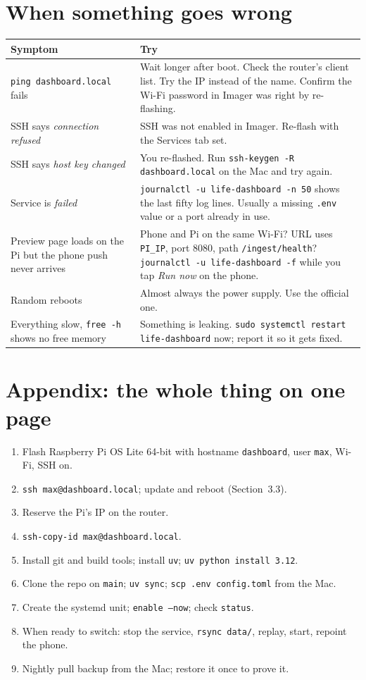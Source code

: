 \documentclass[11pt,letterpaper]{article}
\newcommand{\file}[1]{\texttt{#1}}
\newcommand{\cmd}[1]{\texttt{#1}}
\begin{document}
\section{When something goes wrong}

\begin{tabular}{@{}p{5.5cm}p{9.5cm}@{}}
\toprule
Symptom & Try \\
\midrule
\cmd{ping dashboard.local} fails & Wait longer after boot. Check the router's client list. Try the IP instead of the name. Confirm the Wi-Fi password in Imager was right by re-flashing. \\
SSH says \emph{connection refused} & SSH was not enabled in Imager. Re-flash with the Services tab set. \\
SSH says \emph{host key changed} & You re-flashed. Run \cmd{ssh-keygen -R dashboard.local} on the Mac and try again. \\
Service is \emph{failed} & \cmd{journalctl -u life-dashboard -n 50} shows the last fifty log lines. Usually a missing \file{.env} value or a port already in use. \\
Preview page loads on the Pi but the phone push never arrives & Phone and Pi on the same Wi-Fi? URL uses \cmd{PI\_IP}, port 8080, path \cmd{/ingest/health}? \cmd{journalctl -u life-dashboard -f} while you tap \emph{Run now} on the phone. \\
Random reboots & Almost always the power supply. Use the official one. \\
Everything slow, \cmd{free -h} shows no free memory & Something is leaking. \cmd{sudo systemctl restart life-dashboard} now; report it so it gets fixed. \\
\bottomrule
\end{tabular}

\section*{Appendix: the whole thing on one page}

\begin{enumerate}[nosep]
  \item Flash Raspberry Pi OS Lite 64-bit with hostname \cmd{dashboard}, user \cmd{max}, Wi-Fi, SSH on.
  \item \cmd{ssh max@dashboard.local}; update and reboot (Section~3.3).
  \item Reserve the Pi's IP on the router.
  \item \cmd{ssh-copy-id max@dashboard.local}.
  \item Install git and build tools; install \cmd{uv}; \cmd{uv python install 3.12}.
  \item Clone the repo on \cmd{main}; \cmd{uv sync}; \cmd{scp .env config.toml} from the Mac.
  \item Create the systemd unit; \cmd{enable --now}; check \cmd{status}.
  \item When ready to switch: stop the service, \cmd{rsync data/}, replay, start, repoint the phone.
  \item Nightly pull backup from the Mac; restore it once to prove it.
\end{enumerate}
\end{document}
